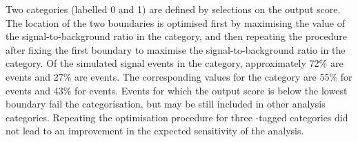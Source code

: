 Two \VBFTag categories (labelled 0 and 1) are defined by selections on the \DiPhoDiJetBdt output score. 
The location of the two boundaries is optimised first by maximising the value of the signal-to-background ratio in the  category, and then repeating the procedure after fixing the first boundary to maximise the signal-to-background ratio in the  category. Of the simulated signal events in the  category, approximately 72\% are \VBF events and 27\% are \ggH events. The corresponding values for the  category are 55\% for \VBF events and 43\% for \ggH events. Events for which the \DiPhoDiJetBdt output score is below the lowest boundary fail the \VBFTag categorisation, but may be still included in other analysis categories. Repeating the optimisation procedure for three \VBF-tagged categories did not lead to an improvement in the expected sensitivity of the analysis.

